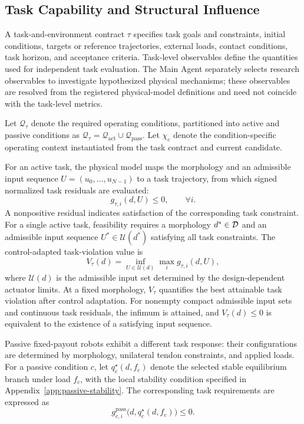 \subsection{Task Capability and Structural Influence}

A task-and-environment contract $\tau$ specifies task goals and constraints, initial conditions, targets or reference trajectories, external loads, contact conditions, task horizon, and acceptance criteria. Task-level observables define the quantities used for independent task evaluation. The Main Agent separately selects research observables to investigate hypothesized physical mechanisms; these observables are resolved from the registered physical-model definitions and need not coincide with the task-level metrics.

Let $\mathcal Q_\tau$ denote the required operating conditions, partitioned into active and passive conditions as $\mathcal Q_\tau=\mathcal Q_{\mathrm{act}}\cup\mathcal Q_{\mathrm{pass}}$. Let $\chi_c$ denote the condition-specific operating context instantiated from the task contract and current candidate.

For an active task, the physical model maps the morphology and an admissible input sequence $U=(u_0,\ldots,u_{N-1})$ to a task trajectory, from which signed normalized task residuals are evaluated:
\begin{equation}
g_{\tau,i}(d,U)\leq0,\qquad \forall i.
\label{eq:taskconstraints}
\end{equation}
A nonpositive residual indicates satisfaction of the corresponding task constraint. For a single active task, feasibility requires a morphology $d^*\in\mathcal{D}$ and an admissible input sequence $U^*\in\mathcal U(d^*)$ satisfying all task constraints. The control-adapted task-violation value is
\begin{equation}
V_\tau(d)=\inf_{U\in\mathcal U(d)}\max_i g_{\tau,i}(d,U),
\label{eq:capability}
\end{equation}
where $\mathcal U(d)$ is the admissible input set determined by the design-dependent actuator limits. At a fixed morphology, $V_\tau$ quantifies the best attainable task violation after control adaptation. For nonempty compact admissible input sets and continuous task residuals, the infimum is attained, and $V_\tau(d)\leq0$ is equivalent to the existence of a satisfying input sequence.

Passive fixed-payout robots exhibit a different task response: their configurations are determined by morphology, unilateral tendon constraints, and applied loads. For a passive condition $c$, let $q_c^\star(d,f_c)$ denote the selected stable equilibrium branch under load $f_c$, with the local stability condition specified in Appendix~\ref{app:passive-stability}. The corresponding task requirements are expressed as
\begin{equation}
g^{\mathrm{pass}}_{c,i}\bigl(d,q_c^\star(d,f_c)\bigr)\leq0.
\label{eq:passive-constraints}
\end{equation}

